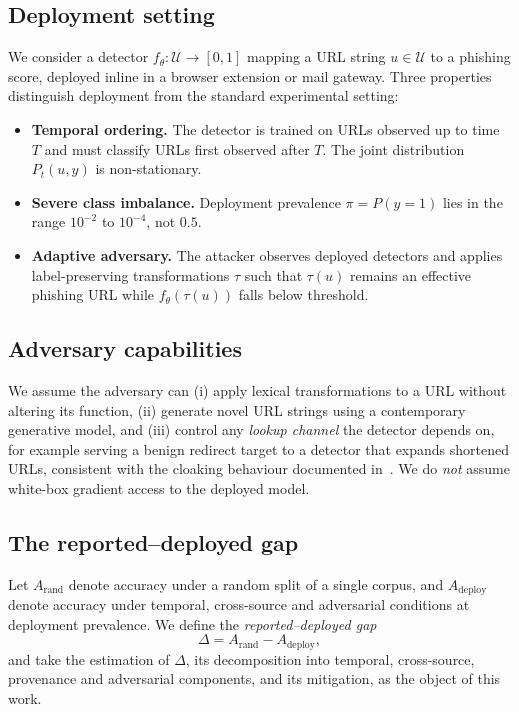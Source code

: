 \documentclass[conference]{IEEEtran}
\begin{document}
\subsection{Deployment setting}

We consider a detector $f_\theta : \mathcal{U} \rightarrow [0,1]$ mapping a URL
string $u \in \mathcal{U}$ to a phishing score, deployed inline in a browser
extension or mail gateway. Three properties distinguish deployment from the
standard experimental setting:

\begin{itemize}
\item \textbf{Temporal ordering.} The detector is trained on URLs observed up to
      time $T$ and must classify URLs first observed after $T$. The joint
      distribution $P_t(u, y)$ is non-stationary.
\item \textbf{Severe class imbalance.} Deployment prevalence
      $\pi = P(y{=}1)$ lies in the range $10^{-2}$ to $10^{-4}$, not $0.5$.
\item \textbf{Adaptive adversary.} The attacker observes deployed detectors and
      applies label-preserving transformations $\tau$ such that $\tau(u)$ remains
      an effective phishing URL while $f_\theta(\tau(u))$ falls below threshold.
\end{itemize}

\subsection{Adversary capabilities}

We assume the adversary can (i) apply lexical transformations to a URL without
altering its function, (ii) generate novel URL strings using a contemporary
generative model, and (iii) control any \emph{lookup channel} the detector depends on, for example
serving a benign redirect target to a detector that
expands shortened URLs, consistent with the cloaking behaviour documented
in~\cite{li2023cloak}. We do \emph{not} assume white-box gradient access to the
deployed model.

\subsection{The reported--deployed gap}

Let $A_{\text{rand}}$ denote accuracy under a random split of a single corpus,
and $A_{\text{deploy}}$ denote accuracy under temporal, cross-source and
adversarial conditions at deployment prevalence. We define the
\emph{reported--deployed gap}
\begin{equation}
\Delta = A_{\text{rand}} - A_{\text{deploy}},
\label{eq:gap}
\end{equation}
and take the estimation of $\Delta$, its decomposition into temporal,
cross-source, provenance and adversarial components, and its mitigation, as the
object of this work.
\end{document}
